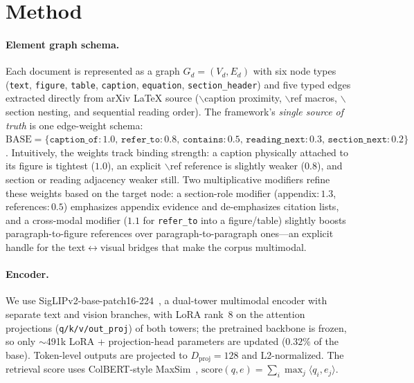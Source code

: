 \documentclass{article}
\begin{document}
\section{Method}

\paragraph{Element graph schema.}
Each document is represented as a graph $G_d\!=\!(V_d,E_d)$ with six
node types (\texttt{text}, \texttt{figure}, \texttt{table},
\texttt{caption}, \texttt{equation}, \texttt{section\_header}) and five
typed edges extracted directly from arXiv LaTeX source ($\backslash$caption
proximity, $\backslash$ref macros, $\backslash$section nesting, and
sequential reading order). The framework's \emph{single source of truth}
is one edge-weight schema:
$\text{BASE}\!=\!\{\texttt{caption\_of}\!:\!1.0,\,
\texttt{refer\_to}\!:\!0.8,\,\texttt{contains}\!:\!0.5,\,
\texttt{reading\_next}\!:\!0.3,\,\texttt{section\_next}\!:\!0.2\}$.
Intuitively, the weights track binding strength: a caption physically
attached to its figure is tightest ($1.0$), an explicit $\backslash$ref
reference is slightly weaker ($0.8$), and section or reading adjacency
weaker still. Two
multiplicative modifiers refine these weights based on the target node:
a section-role modifier (appendix$:\!1.3$, references$:\!0.5$)
emphasizes appendix evidence and de-emphasizes citation lists, and a
cross-modal modifier ($1.1$ for \texttt{refer\_to} into a figure/table)
slightly boosts paragraph-to-figure references over
paragraph-to-paragraph ones---an explicit handle for the
text$\leftrightarrow$visual bridges that make the corpus multimodal.

\paragraph{Encoder.}
We use SigLIPv2-base-patch16-224~\cite{siglip2}, a dual-tower multimodal
encoder with separate text and vision branches, with LoRA rank~8 on the
attention projections (\texttt{q/k/v/out\_proj}) of both towers; the
pretrained backbone is frozen, so only $\sim$491k LoRA + projection-head
parameters are updated ($0.32\%$ of the base). Token-level outputs are projected to
$D_\text{proj}\!=\!128$ and L2-normalized. The retrieval score uses ColBERT-style MaxSim~\cite{colbert},
$\mathrm{score}(q,e)\!=\!\sum_i\max_j\langle q_i,e_j\rangle$.
\end{document}
